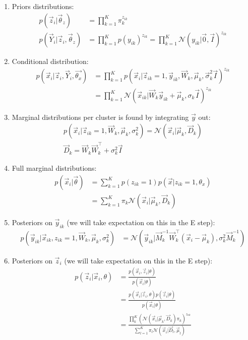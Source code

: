 \documentclass[12pt,twoside]{article}
\begin{document}
\begin{enumerate}
\item Priors distributions:
	\begin{align*}
		p(\vec{z}_i \vert \vec{\theta}_z) & = \prod_{k=1}^K \pi_k^{z_{ik}}\\
		p(\vec{Y}_i \vert \vec{z}_i, \vec{\theta}_z) & = \prod_{k=1}^K p(y_{ik})^{z_{ik}} = \prod_{k=1}^K \mathcal{N}(y_{ik}\vert \vec{0}, \vec{I})^{z_{ik}}
	\end{align*}

\item Conditional distribution:
	\begin{align*}
		p(\vec{x}_i \vert \vec{z}_i, \vec{Y}_i, \vec{\theta_x}) 
		& = \prod_{k=1}^K p(\vec{x}_i \vert \vec{z}_{ik}=1, \vec{y}_{ik}, \vec{W}_k, \vec{\mu}_k, \vec{\sigma}_k^2\vec{I})^{z_{ik}}\\
		& = \prod_{k=1}^K \mathcal{N}(\vec{x}_{ik}\vert \vec{W}_k \vec{y}_{ik}+\vec{\mu}_k, \sigma_k\vec{I})^{z_{ik}}		
	\end{align*}

\item Marginal distributions per cluster is found by integrating $\vec{y}$ out:
	\begin{align*}
		p(\vec{x}_i \vert \vec{z}_{ik}=1, \vec{W}_k, \vec{\mu}_k, \sigma_k^2) = \mathcal{N}(\vec{x}_i\vert \vec{\mu}_k, \vec{D}_k)\\
		\vec{D}_k = \vec{W}_k\vec{W}_k^\top + \sigma_k^2 \vec{I}
	\end{align*}

\item Full marginal distributions:
	\begin{align*}
		p(\vec{x}_i \vert \vec{\theta}) 
		&= \sum_{k=1}^K p(z_{ik}=1)p(\vec{x}\vert z_{ik}=1, \theta_x)\\
		&= \sum_{k=1}^K \pi_k \mathcal{N}(\vec{x}_i\vert \vec{\mu}_k, \vec{D}_k)		
	\end{align*}

\item Posteriors on $\vec{y}_{ik}$ (we will take expectation on this in the E step):
	\begin{align*}
		p(\vec{y}_{ik} \vert \vec{x}_{ik}, z_{ik}=1, \vec{W}_{k}, \vec{\mu}_{k}, \sigma_k^2 )
		&= \mathcal{N}\left(\vec{y}_{ik}\vert \vec{M}_k^{-1}\vec{W}_k^\top(\vec{x}_i - \vec{\mu}_k),\sigma_k^2 \vec{M}_k^{-1}\right)
	\end{align*}

\item Posteriors on $\vec{z}_i$  (we will take expectation on this in the E step):
\begin{align*}
p(\vec{z}_i \vert \vec{x}_i, \theta)
&= \frac{p(\vec{x}_i, \vec{z}_i \vert \theta)}{p(\vec{x}_i \vert \theta)}\\
&= \frac{p(\vec{x}_i\vert \vec{z}_i, \theta)p(\vec{z}_i \vert \theta)}{p(\vec{x}_i \vert \theta)}\\
&= \frac{\prod_k^K \left(\mathcal{N}(\vec{x}_i \vert \vec{\mu}_k, \vec{D}_k)\pi_k\right)^{z_{nk}}}{\sum_{l =1}^K \pi_l \mathcal{N}(\vec{x}_i \vert \vec{D}_l, \vec{\mu}_l)}
\end{align*}

\end{enumerate}
\end{document}
